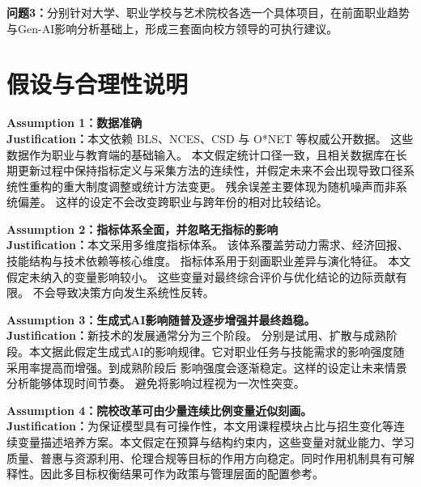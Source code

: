 \documentclass{mcmthesis}
\begin{document}
\noindent\textbf{问题3：}分别针对大学、职业学校与艺术院校各选一个具体项目，在前面职业趋势与Gen-AI影响分析基础上，形成三套面向校方领导的可执行建议。









\section{假设与合理性说明}


\noindent\textbf{Assumption 1：数据准确}\\
\noindent\textbf{Justification：}本文依赖 BLS、NCES、CSD 与 O*NET 等权威公开数据。
这些数据作为职业与教育端的基础输入。
本文假定统计口径一致，且相关数据库在长期更新过程中保持指标定义与采集方法的连续性，并假定未来不会出现导致口径系统性重构的重大制度调整或统计方法变更。
残余误差主要体现为随机噪声而非系统偏差。
这样的设定不会改变跨职业与跨年份的相对比较结论。

\medskip
\noindent\textbf{Assumption 2：指标体系全面，并忽略无指标的影响}\\
\noindent\textbf{Justification：}本文采用多维度指标体系。
该体系覆盖劳动力需求、经济回报、技能结构与技术依赖等核心维度。
指标体系用于刻画职业差异与演化特征。
本文假定未纳入的变量影响较小。
这些变量对最终综合评价与优化结论的边际贡献有限。
不会导致决策方向发生系统性反转。



\medskip
\noindent\textbf{Assumption 3：生成式AI影响随普及逐步增强并最终趋稳。}\\
\noindent\textbf{Justification：}新技术的发展通常分为三个阶段。
分别是试用、扩散与成熟阶段。本文据此假定生成式AI的影响规律。它对职业任务与技能需求的影响强度随采用率提高而增强。到成熟阶段后 影响强度会逐渐稳定。这样的设定让未来情景分析能够体现时间节奏。
避免将影响过程视为一次性突变。

\medskip
\noindent\textbf{Assumption 4：院校改革可由少量连续比例变量近似刻画。}\\
\noindent\textbf{Justification：}为保证模型具有可操作性，本文用课程模块占比与招生变化等连续变量描述培养方案。本文假定在预算与结构约束内，这些变量对就业能力、学习质量、普惠与资源利用、伦理合规等目标的作用方向稳定。同时作用机制具有可解释性。因此多目标权衡结果可作为政策与管理层面的配置参考。
\end{document}
